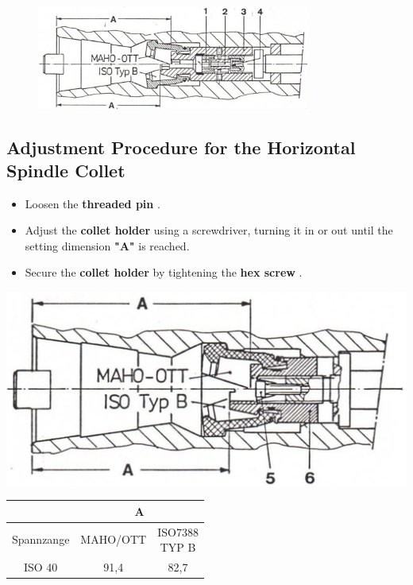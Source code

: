 \begin{figure}[H]
    \centering
    \includegraphics[width=0.8\textwidth]{images/chapter7/collet_adjustment.jpg}
    \label{fig:collet_adjustment}
\end{figure}


\newpage

\subsection*{Adjustment Procedure for the Horizontal Spindle Collet}

\begin{itemize}
    \item Loosen the \textbf{threaded pin }.
    \item Adjust the \textbf{collet holder } using a screwdriver, turning it in or out until the setting dimension \textbf{"A"} is reached.
    \item Secure the \textbf{collet holder } by tightening the \textbf{hex screw }.
\end{itemize}

\begin{minipage}{0.5\textwidth}
    \centering
    \includegraphics[width=\textwidth]{images/chapter7/collet_adjustment_horizontal.jpg}
\end{minipage}
\hfill
\begin{minipage}{0.5\textwidth}
    \centering
    \renewcommand{\arraystretch}{1.5} %
    \begin{tabular}{|c|c|c|}
        \hline
        & \multicolumn{2}{c|}{A} \\ \hline
        Spannzange & MAHO/OTT & \shortstack{\rule{0pt}{1.2em} ISO7388 \\ TYP B} \\ \hline
        ISO 40 & 91,4 & 82,7 \\ \hline
    \end{tabular}
\end{minipage}


